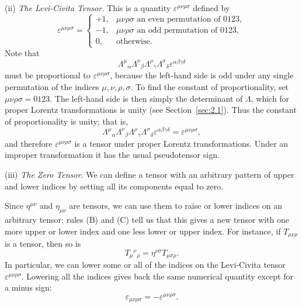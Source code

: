 \noindent(ii) \emph{The Levi-Civita Tensor.} This is a quantity
\(\varepsilon^{\mu\nu\rho\sigma}\) defined by
\begin{equation}
  \varepsilon^{\mu\nu\rho\sigma}=
  \begin{cases}
    +1,&\mu\nu\rho\sigma\text{ an even permutation of }0123,\\
    -1,&\mu\nu\rho\sigma\text{ an odd permutation of }0123,\\
    0,&\text{otherwise}.
  \end{cases}
  \tag{2.5.13}\label{eq:2.5.13}
\end{equation}
Note that
\[
  \Lambda^\mu{}_\alpha\Lambda^\nu{}_\beta
  \Lambda^\rho{}_\gamma\Lambda^\sigma{}_\delta
  \varepsilon^{\alpha\beta\gamma\delta}
\]
must be proportional to \(\varepsilon^{\mu\nu\rho\sigma}\), because the
left-hand side is odd under any single permutation of the indices
\(\mu,\nu,\rho,\sigma\). To find the constant of proportionality, set
\(\mu\nu\rho\sigma=0123\). The left-hand side is then simply the determinant
of \(\Lambda\), which for proper Lorentz transformations is unity (see
Section~\ref{sec:2.1}). Thus the constant of proportionality is unity; that is,
\begin{equation}
  \Lambda^\mu{}_\alpha\Lambda^\nu{}_\beta
  \Lambda^\rho{}_\gamma\Lambda^\sigma{}_\delta
  \varepsilon^{\alpha\beta\gamma\delta}
  =\varepsilon^{\mu\nu\rho\sigma},
  \tag{2.5.14}\label{eq:2.5.14}
\end{equation}
and therefore \(\varepsilon^{\mu\nu\rho\sigma}\) is a tensor under proper
Lorentz transformations. Under an improper transformation it has the usual
pseudotensor sign.

\noindent(iii) \emph{The Zero Tensor.} We can define a tensor with an
arbitrary pattern of upper and lower indices by setting all its components
equal to zero.

Since \(\eta^{\mu\nu}\) and \(\eta_{\mu\nu}\) are tensors, we can use them to
raise or lower indices on an arbitrary tensor; rules (B) and (C) tell us that
this gives a new tensor with one more upper or lower index and one less lower or
upper index. For instance, if \(T_{\mu\nu\rho}\) is a tensor, then so is
\[
  T_\mu{}^\nu{}_\rho=\eta^{\nu\sigma}T_{\mu\sigma\rho}.
\]
In particular, we can lower some or all of the indices on the Levi-Civita
tensor \(\varepsilon^{\mu\nu\rho\sigma}\). Lowering all the indices gives back
the same numerical quantity except for a minus sign:
\begin{equation}
  \varepsilon_{\mu\nu\rho\sigma}=-\varepsilon^{\mu\nu\rho\sigma}.
  \tag{2.5.15}\label{eq:2.5.15}
\end{equation}

